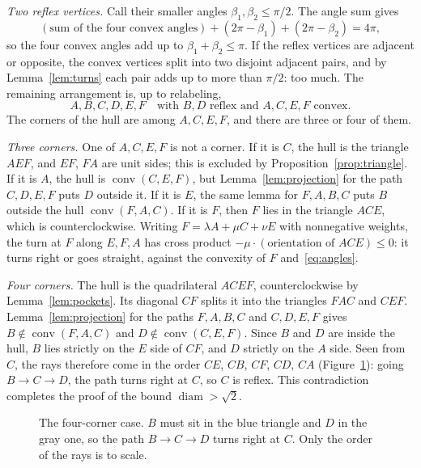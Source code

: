 \documentclass[11pt]{article}
\theoremstyle{remark}
\DeclareMathOperator{\conv}{conv}
\DeclareMathOperator{\diam}{diam}
\begin{document}
\emph{Two reflex vertices.} Call their smaller angles $\beta_1,\beta_2\le\pi/2$. The angle sum
gives
\[
  (\text{sum of the four convex angles})+(2\pi-\beta_1)+(2\pi-\beta_2)=4\pi,
\]
so the four convex angles add up to $\beta_1+\beta_2\le\pi$. If the reflex vertices are adjacent
or opposite, the convex vertices split into two disjoint adjacent pairs, and by
Lemma~\ref{lem:turns} each pair adds up to more than $\pi/2$: too much. The remaining
arrangement is, up to relabeling,
\[
  A,B,C,D,E,F\quad\text{with $B,D$ reflex and $A,C,E,F$ convex.}
\]
The corners of the hull are among $A,C,E,F$, and there are three or four of them.

\emph{Three corners.} One of $A,C,E,F$ is not a corner.
If it is $C$, the hull is the triangle $AEF$, and $EF$, $FA$ are unit sides; this is
excluded by Proposition~\ref{prop:triangle}. If it is $A$, the hull is $\conv(C,E,F)$, but
Lemma~\ref{lem:projection} for the path $C,D,E,F$ puts $D$ outside it. If it is
$E$, the same lemma for $F,A,B,C$ puts $B$ outside the hull $\conv(F,A,C)$. If it is $F$, then $F$
lies in the triangle $ACE$, which is counterclockwise. Writing $F=\lambda A+\mu C+\nu E$ with
nonnegative weights, the turn at $F$ along $E,F,A$ has cross product
$-\mu\cdot(\text{orientation of }ACE)\le0$: it turns right or goes straight, against the
convexity of $F$ and~\eqref{eq:angles}.

\emph{Four corners.} The hull is the quadrilateral $ACEF$, counterclockwise by
Lemma~\ref{lem:pockets}. Its diagonal
$CF$ splits it into the triangles $FAC$ and $CEF$. Lemma~\ref{lem:projection} for the paths
$F,A,B,C$ and $C,D,E,F$ gives $B\notin\conv(F,A,C)$ and $D\notin\conv(C,E,F)$. Since $B$ and
$D$ are inside the hull, $B$ lies strictly on the $E$ side of $CF$, and $D$ strictly on the
$A$ side. Seen from $C$, the rays therefore come in the order $CE$, $CB$, $CF$, $CD$, $CA$
(Figure~\ref{fig:hull}): going $B\to C\to D$, the path turns right at $C$, so $C$ is reflex.
This contradiction completes the proof of the bound $\diam>\sqrt2$.

\begin{figure}[ht]
\centering
{}
\caption{The four-corner case. $B$ must sit in the blue triangle and $D$ in the gray one, so
the path $B\to C\to D$ turns right at $C$. Only the order of the rays is to scale.}
\label{fig:hull}
\end{figure}
\end{document}
